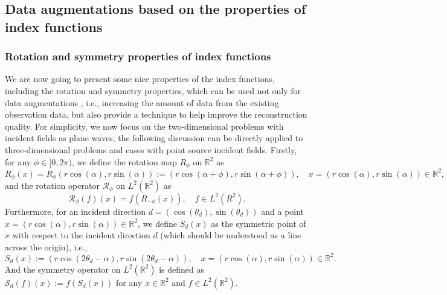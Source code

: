 \documentclass{article}
\begin{document}
\subsection{Data augmentations based on the properties of index functions}
\subsubsection{Rotation and symmetry properties of index functions}

We are now going to present some nice properties of the index functions, including the rotation and symmetry properties,
which can be used not only for data augmentations \cite{shorten2019survey}, i.e., increasing the amount of data from the existing observation data, but also provide a technique to help improve the reconstruction quality. For simplicity, we now focus on the two-dimensional problems with incident fields as plane waves, the following discussion can be directly applied to three-dimensional problems and cases with point source incident fields. Firstly, for any $\phi\in [0,2\pi)$, we define the rotation map $R_{\phi}$ on $\mathbb{R}^{2}$ as
\begin{equation}
	R_{\phi}(x)=R_{\phi}(r\cos(\alpha),r\sin(\alpha)):=(r\cos(\alpha+\phi),r\sin(\alpha+\phi)), \quad x=(r\cos(\alpha),r\sin(\alpha))\in \mathbb{R}^{2},
\end{equation}
and the rotation operator $\mathcal{R}_{\phi}$ on $L^{2}(\mathbb{R}^{2})$ as
\begin{equation}
	\mathcal{R}_{\phi}(f)(x)=f(R_{-\phi}(x)), \quad f\in L^{2}(R^{2}).
\end{equation}
Furthermore, for an incident direction $d=(\cos(\theta_d),\sin(\theta_d))$ and a point $x=(r\cos(\alpha),r\sin(\alpha))\in \mathbb{R}^{2} $, we define $S_d(x)$ as the symmetric point of $x$ with respect to the incident direction $d$ (which should be understood as a line across the origin), i.e.,
\begin{equation}
    S_d(x) :=(r\cos(2\theta_d-\alpha),r\sin(2\theta_d-\alpha)), \quad x=(r\cos(\alpha),r\sin(\alpha))\in \mathbb{R}^{2}.
\end{equation}
And the symmetry operator on $L^2(\mathbb{R}^2)$ is defined as $\mathcal{S}_d(f)(x):= f(S_d(x))$ for any $x\in \mathbb{R}^2$ and $f\in L^2(\mathbb{R}^2)$. 
\end{document}
